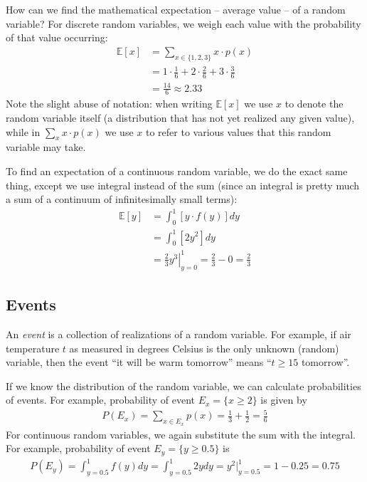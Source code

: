 \documentclass{article}
\begin{document}
How can we find the mathematical expectation -- average value -- of a random variable? For discrete random variables, we weigh each value with the probability of that value occurring:
\begin{align*}
	\mathbb{E}[x] &= \sum_{x \in \{1,2,3\}} x \cdot p(x)
	\\
	&= 1 \cdot \frac{1}{6} + 2 \cdot \frac{2}{6} + 3 \cdot \frac{3}{6}
	\\
	&= \frac{14}{6} \approx 2.33
\end{align*}
Note the slight abuse of notation: when writing $\mathbb{E}[x]$ we use $x$ to denote the random variable itself (a distribution that has not yet realized any given value), while in $\sum_{x} x \cdot p(x)$ we use $x$ to refer to various values that this random variable may take.

To find an expectation of a continuous random variable, we do the exact same thing, except we use integral instead of the sum (since an integral is pretty much a sum of a continuum of infinitesimally small terms):
\begin{align*}
	\mathbb{E}[y] &= \int_0^1 \left[y \cdot f(y)\right] dy
	\\
	&= \int_0^1 \left[2y^2 \right] dy
	\\
	&= \left. \frac{2}{3} y^3 \right|_{y=0}^{1} = \frac{2}{3} - 0 = \frac{2}{3}
\end{align*}


\subsection{Events}

An \emph{event} is a collection of realizations of a random variable. For example, if air temperature $t$ as measured in degrees Celsius is the only unknown (random) variable, then the event ``it will be warm tomorrow'' means ``$t \geq 15$ tomorrow''.

If we know the distribution of the random variable, we can calculate probabilities of events. For example, probability of event $E_x = \{x \geq 2\}$ is given by
\begin{align*}
	P(E_x) = \sum_{x \in E_x} p(x) = \frac{1}{3} + \frac{1}{2} = \frac{5}{6}
\end{align*}
For continuous random variables, we again substitute the sum with the integral. For example, probability of event $E_y = \{y \geq 0.5\}$ is
\begin{align*}
	P(E_y) = \int_{y=0.5}^1 f(y) dy  = \int_{y=0.5}^1 2y dy = y^2 |_{y=0.5}^1 = 1 - 0.25 = 0.75
\end{align*}
\end{document}
